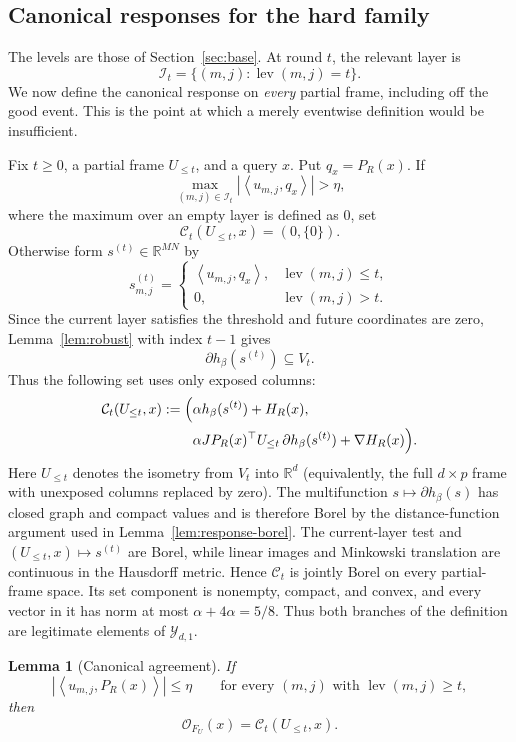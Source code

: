 \documentclass[11pt,a4paper]{article}
\newcommand{\R}{\mathbb{R}}
\newcommand{\abs}[1]{\left\lvert #1\right\rvert}
\newcommand{\inner}[2]{\left\langle #1,#2\right\rangle}
\newcommand{\cO}{\mathcal O}
\newcommand{\cY}{\mathcal Y}
\newcommand{\cI}{\mathcal I}
\newcommand{\cC}{\mathcal C}
\DeclareMathOperator{\lev}{lev}
\newtheorem{lemma}[theorem]{Lemma}
\theoremstyle{definition}
\numberwithin{equation}{section}
\begin{document}
\subsection{Canonical responses for the hard family}\label{sec:application}

The levels are those of Section~\ref{sec:base}.  At round $t$, the relevant layer is
\[
 \cI_t=\{(m,j):\lev(m,j)=t\}.
\]
We now define the canonical response on \emph{every} partial frame, including off the good event.  This is the point at which a merely eventwise definition would be insufficient.

Fix $t\ge0$, a partial frame $U_{\le t}$, and a query $x$.  Put $q_x=P_R(x)$.  If
\begin{equation}\label{eq:current-layer-test}
 \max_{(m,j)\in\cI_t}\abs{\inner{u_{m,j}}{q_x}}>\eta,
\end{equation}
where the maximum over an empty layer is defined as $0$,
set
\[
 \cC_t(U_{\le t},x)=(0,\{0\}).
\]
Otherwise form $s^{(t)}\in\R^{MN}$ by
\[
 s^{(t)}_{m,j}=
 \begin{cases}
 \inner{u_{m,j}}{q_x},&\lev(m,j)\le t,\\
 0,&\lev(m,j)>t.
 \end{cases}
\]
Since the current layer satisfies the threshold and future coordinates are zero, Lemma~\ref{lem:robust} with index $t-1$ gives
\[
 \partial h_\beta(s^{(t)})\subseteq V_t.
\]
Thus the following set uses only exposed columns:
\begin{align}\label{eq:canonical-response}
 \cC_t(U_{\le t},x)
 :=\Bigl(&\alpha h_\beta(s^{(t)})+H_R(x),\\
 &\alpha JP_R(x)^\top U_{\le t}\,
       \partial h_\beta(s^{(t)})+\nabla H_R(x)\Bigr).
\end{align}
Here $U_{\le t}$ denotes the isometry from $V_t$ into $\R^d$ (equivalently, the full $d\times p$ frame with unexposed columns replaced by zero).  The multifunction $s\mapsto\partial h_\beta(s)$ has closed graph and compact values and is therefore Borel by the distance-function argument used in Lemma~\ref{lem:response-borel}.  The current-layer test and $(U_{\le t},x)\mapsto s^{(t)}$ are Borel, while linear images and Minkowski translation are continuous in the Hausdorff metric.  Hence $\cC_t$ is jointly Borel on every partial-frame space.
Its set component is nonempty, compact, and convex, and every vector in it
has norm at most $\alpha+4\alpha=5/8$. Thus both branches of the definition
are legitimate elements of $\cY_{d,1}$.

\begin{lemma}[Canonical agreement]\label{lem:canonical-agreement}
If
\[
 \abs{\inner{u_{m,j}}{P_R(x)}}\le\eta
 \qquad\text{for every }(m,j)\text{ with }\lev(m,j)\ge t,
\]
then
\[
 \cO_{F_U}(x)=\cC_t(U_{\le t},x).
\]
\end{lemma}
\end{document}
